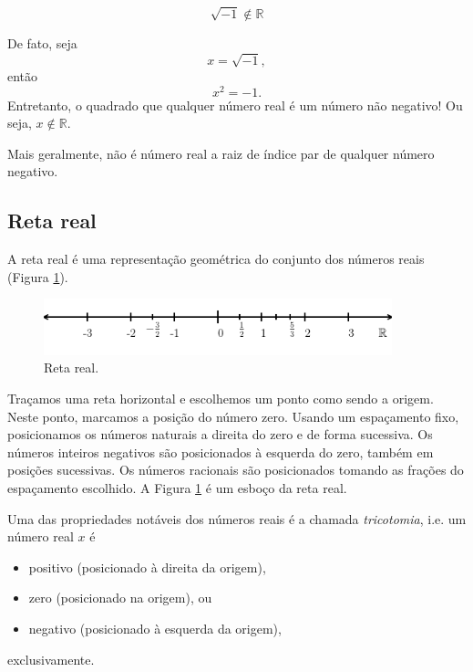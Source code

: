 \begin{obs}
  \begin{equation}
    \sqrt{-1}\not\in\mathbb{R}
  \end{equation}

  De fato, seja
  \begin{equation}
    x = \sqrt{-1},
  \end{equation}
  então
  \begin{equation}
    x^2 = -1.
  \end{equation}
  Entretanto, o quadrado que qualquer número real é um número não negativo! Ou seja, $x\not\in\mathbb{R}$.

  Mais geralmente, não é número real a raiz de índice par de qualquer número negativo.
\end{obs}

\subsection{Reta real}\label{ssec:numreal_retareal}

A reta real é uma representação geométrica do conjunto dos números reais (Figura \ref{fig:conjreal_retareal}).

\begin{figure}[H]
  \centering
  \includegraphics[width=0.9\textwidth]{./cap_numreal/dados/fig_retareal/fig_retareal}
  \caption{Reta real.}
  \label{fig:conjreal_retareal}
\end{figure}

Traçamos uma reta horizontal e escolhemos um ponto como sendo a origem. Neste ponto, marcamos a posição do número zero. Usando um espaçamento fixo, posicionamos os números naturais a direita do zero e de forma sucessiva. Os números inteiros negativos são posicionados à esquerda do zero, também em posições sucessivas. Os números racionais são posicionados tomando as frações do espaçamento escolhido. A Figura \ref{fig:conjreal_retareal} é um esboço da reta real.

Uma das propriedades notáveis dos números reais é a chamada \emph{tricotomia}, i.e. um número real $x$ é
\begin{itemize}
\item positivo (posicionado à direita da origem),
\item zero (posicionado na origem), ou
\item negativo (posicionado à esquerda da origem),
\end{itemize}
exclusivamente.

